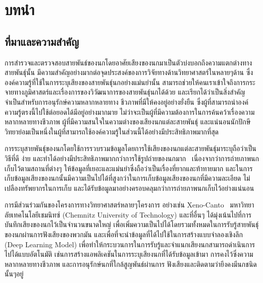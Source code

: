 \chapter{บทนำ}
\label{chapter:introduction}

\section{ที่มาและความสำคัญ}
การสำรวจและตรวจสอบสายพันธ์ของนกโดยอาศัยเสียงของนกมาเป็นตัวบ่งบอกถึงความแตกต่างทางสายพันธุ์นั้น 
มีความสำคัญอย่างมากต่อจุดประสงค์ของการวิจัยทางด้านวิทยาศาสตร์ในหลายๆด้าน ซึ่งองค์ความรู้ที่ใช้ในการระบุเสียงของสายพันธุ์นกอย่างแม่นยำนั้น 
สามารถช่วยให้คนเราเข้าใจถึงการกระจายทางภูมิศาสตร์และเรื่องการของวิวัฒนาการของสายพันธุ์นกได้ด้วย และเรียกได้ว่าเป็นสิ่งสำคัญจำเป็นสำหรับการอนุรักษ์ความหลากหลายทาง
ชีวภาพที่มีให้คงอยู่อย่างยั่งยืน ซึ่งผู้ที่สามารถนำองค์ความรู้ตรงนี้ไปใช้ต่อยอดได้มีอยู่อย่างมากมาย ไม่ว่าจะเป็นผู้ที่มีความต้องการในการค้นคว้าเรื่องความหลากหลายทางชีวภาพ 
ผู้ที่มีความสนใจในความต่างของเสียงนกแต่ละสายพันธุ์ และแน่นอนนักปักษีวิทยาย่อมเป็นหนึ่งในผู้ที่สามารถใช้องค์ความรู้ในส่วนนี้ได้อย่างมีประสิทธิภาพมากที่สุด \par

การระบุสายพันธุ์ของนกโดยใช้การรวบรวมข้อมูลโดยการใช้เสียงของนกแต่ละสายพันธุ์มาระบุถือว่าเป็นวิธีที่ดี ง่าย และทำได้อย่างมีประสิทธิภาพมากกว่าการใช้รูปถ่ายของนกมาก~\cite{birdclef}
เนื่องจากว่าการถ่ายภาพนกเก็บไว้ตามสถานที่ต่างๆ ให้ข้อมูลที่เยอะและแม่นยำซึ่งถือว่าเป็นเรื่องที่ยากและท้าทายมาก และในการเก็บข้อมูลเสียงของนกนั้นมีความเป็นไปได้ที่สูงกว่าในการเก็บข้อมูลเสียงของนกที่มีความละเอียด 
ไม่เปลืองทรัพยากรในการเก็บ และได้รับข้อมูลมาอย่างครอบคลุมกว่าการถ่ายภาพนกเก็บไว้อย่างแน่นอน \par

การมีส่วนร่วมกันของโครงการทางวิทยาศาสตร์หลายๆโครงการ อย่างเช่น Xeno-Canto~\cite{xeno-canto} มหาวิทยาลัยเทคโนโลยีเชมนิทซ์ (Chemnitz University of Technology) และที่อื่นๆ
ได้มุ่งเน้นไปที่การบันทึกเสียงของนกไว้เป็นจำนวนขนาดใหญ่ เพื่อเพิ่มความเป็นไปได้โดยรวมทั้งหมดในการรับรู้สายพันธุ์ของนกผ่านการฟังเสียงของพวกมัน และเพื่อที่จะนำข้อมูลที่ได้ไปใช้ในการสร้างแบบจำลองเชิงลึก (Deep Learning Model) 
เพื่อทำให้กระบวนการในการรับรู้และจำแนกเสียงนกสามารถดำเนินการไปได้แบบอัตโนมัติ เช่นการสร้างแอพลิเคชันในการระบุเสียงนกที่ได้รับข้อมูลเข้ามา การคงไว้ซึ่งความหลากหลายทางชีวภาพ และการอนุรักษ์นกที่ใกล้สูญพันธ์ผ่านการ
ฟังเสียงและติดตามว่ายีงคงมีนกชนิดนั้นๆอยู่ \par

